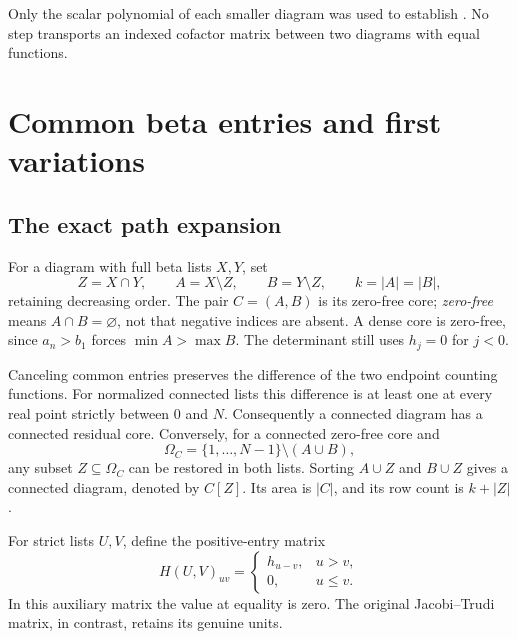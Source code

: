 \documentclass[11pt,a4paper]{amsart}
\numberwithin{equation}{section}
\theoremstyle{plain}
\theoremstyle{definition}
\begin{document}
Only the scalar polynomial of each smaller diagram was used to establish
.  No step transports an indexed cofactor matrix
between two diagrams with equal functions.

\section{Common beta entries and first variations}\label{sec:restoration}

\subsection{The exact path expansion}

For a diagram with full beta lists \(X,Y\), set
\[
 Z=X\cap Y,\qquad A=X\setminus Z,\qquad B=Y\setminus Z,
 \qquad k=|A|=|B|,
\]
retaining decreasing order.  The pair \(C=(A,B)\) is its zero-free core;
\emph{zero-free} means \(A\cap B=\varnothing\), not that negative indices
are absent.  A dense core is zero-free, since \(a_n>b_1\) forces
\(\min A>\max B\).  The determinant still uses \(h_j=0\) for \(j<0\).

Canceling common entries preserves the difference of the two endpoint
counting functions.  For normalized connected lists this difference is at
least one at every real point strictly between \(0\) and \(N\).
Consequently a connected diagram has a connected residual core.
Conversely, for a connected zero-free core and
\[
 \Omega_C=\{1,\ldots,N-1\}\setminus(A\cup B),
\]
any subset \(Z\subseteq\Omega_C\) can be restored in both lists.
Sorting \(A\cup Z\) and \(B\cup Z\) gives a connected diagram, denoted
by \(C[Z]\).  Its area is \(|C|\), and its row count is \(k+|Z|\).

For strict lists \(U,V\), define the positive-entry matrix
\[
 H(U,V)_{uv}=\begin{cases}h_{u-v},&u>v,\\0,&u\le v.\end{cases}
\]
In this auxiliary matrix the value at equality is zero.  The original
Jacobi--Trudi matrix, in contrast, retains its genuine units.
\end{document}
